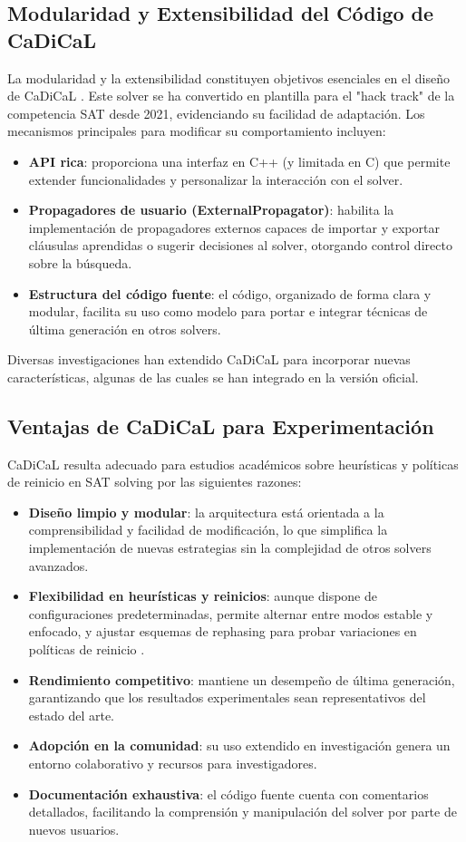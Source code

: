 \subsection{Modularidad y Extensibilidad del Código de CaDiCaL}
La modularidad y la extensibilidad constituyen objetivos esenciales en el diseño de CaDiCaL \cite{Cadical2.0}. Este solver se ha convertido en plantilla para el "hack track" de la competencia SAT desde 2021, evidenciando su facilidad de adaptación. Los mecanismos principales para modificar su comportamiento incluyen:
\begin{itemize}
  \item \textbf{API rica}: proporciona una interfaz en C++ (y limitada en C) que permite extender funcionalidades y personalizar la interacción con el solver.
  \item \textbf{Propagadores de usuario (ExternalPropagator)}: habilita la implementación de propagadores externos capaces de importar y exportar cláusulas aprendidas o sugerir decisiones al solver, otorgando control directo sobre la búsqueda.
  \item \textbf{Estructura del código fuente}: el código, organizado de forma clara y modular, facilita su uso como modelo para portar e integrar técnicas de última generación en otros solvers.
\end{itemize}
Diversas investigaciones han extendido CaDiCaL para incorporar nuevas características, algunas de las cuales se han integrado en la versión oficial.

\subsection{Ventajas de CaDiCaL para Experimentación}
CaDiCaL resulta adecuado para estudios académicos sobre heurísticas y políticas de reinicio en SAT solving por las siguientes razones:
\begin{itemize}
  \item \textbf{Diseño limpio y modular}: la arquitectura está orientada a la comprensibilidad y facilidad de modificación, lo que simplifica la implementación de nuevas estrategias sin la complejidad de otros solvers avanzados.
  \item \textbf{Flexibilidad en heurísticas y reinicios}: aunque dispone de configuraciones predeterminadas, permite alternar entre modos estable y enfocado, y ajustar esquemas de rephasing para probar variaciones en políticas de reinicio \cite{BetterDecisionHeuristics}.
  \item \textbf{Rendimiento competitivo}: mantiene un desempeño de última generación, garantizando que los resultados experimentales sean representativos del estado del arte.
  \item \textbf{Adopción en la comunidad}: su uso extendido en investigación genera un entorno colaborativo y recursos para investigadores.
  \item \textbf{Documentación exhaustiva}: el código fuente cuenta con comentarios detallados, facilitando la comprensión y manipulación del solver por parte de nuevos usuarios.
\end{itemize}


